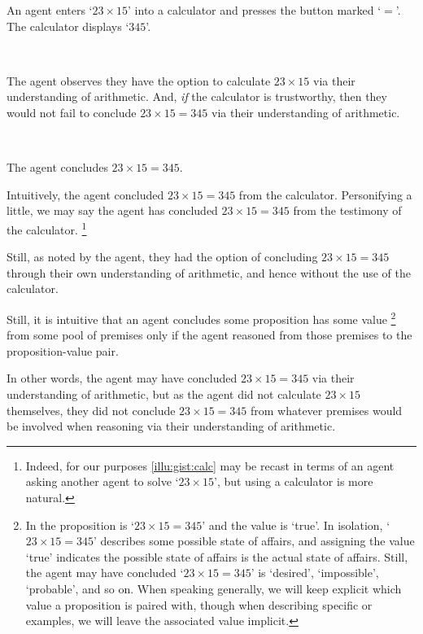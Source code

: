 \begin{note}
  \begin{scenario}[Multiplication]
    \label{illu:gist:calc}
    An agent enters `\(23 \times 15\)' into a calculator and presses the button marked `\(=\)'.
    The calculator displays `\(345\)'.

    \mbox{ }

    The agent observes they have the option to calculate \(23 \times 15\) via their understanding of arithmetic.
    And, \emph{if} the calculator is trustworthy, then they would not fail to conclude \(23 \times 15 = 345\) via their understanding of arithmetic.

    \mbox{ }

    The agent concludes \(23 \times 15 = 345\).
  \end{scenario}

  Intuitively, the agent concluded \(23 \times 15 = 345\) from the calculator.
  Personifying a little, we may say the agent has concluded \(23 \times 15 = 345\) from the testimony of the calculator.%
  \footnote{
    Indeed, for our purposes \autoref{illu:gist:calc} may be recast in terms of an agent asking another agent to solve `\(23 \times 15\)', but using a calculator is more natural.
  }

  Still, as noted by the agent, they had the option of concluding \(23 \times 15 = 345\) through their own understanding of arithmetic, and hence without the use of the calculator.

  Still, it is intuitive that an agent concludes some proposition has some value%
  \footnote{In  the proposition is `\(23 \times 15 = 345\)' and the value is `true'.
    In isolation, `\(23 \times 15 = 345\)' describes some possible state of affairs, and assigning the value `true' indicates the possible state of affairs is the actual state of affairs.
    Still, the agent may have concluded `\(23 \times 15 = 345\)' is `desired', `impossible', `probable', and so on.
    When speaking generally, we will keep explicit which value a proposition is paired with, though when describing specific  or examples, we will leave the associated value implicit.
  }
  from some pool of premises only if the agent reasoned from those premises to the proposition-value pair.

  In other words, the agent may have concluded \(23 \times 15 = 345\) via their understanding of arithmetic, but as the agent did not calculate \(23 \times 15\) themselves, they did not conclude \(23 \times 15 = 345\) from whatever premises would be involved when reasoning via their understanding of arithmetic.


\end{note}
